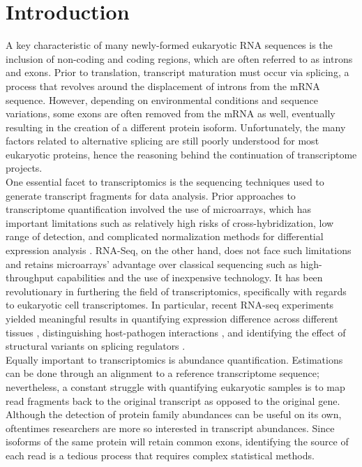 \section{Introduction}

A key characteristic of many newly-formed eukaryotic RNA sequences is the inclusion of non-coding and coding regions, 
which are often referred to as introns and exons. Prior to translation, transcript maturation must occur via splicing, 
a process that revolves around the displacement of introns from the mRNA sequence. However, depending on environmental 
conditions and sequence variations, some exons are often removed from the mRNA as well, eventually resulting in the creation of 
a different protein isoform. Unfortunately, the many factors related to alternative splicing are still poorly understood for most 
eukaryotic proteins, hence the reasoning behind the continuation of transcriptome projects.\\

One essential facet to transcriptomics is the sequencing techniques used to generate transcript fragments for data analysis. 
Prior approaches to transcriptome quantification involved the use of microarrays, which has important limitations such as relatively high 
risks of cross-hybridization, low range of detection, and complicated normalization methods for differential expression analysis 
\cite{Wang_Gerstein_Snyder_2009}. 
RNA-Seq, on the other hand, does not face such limitations and retains microarrays’ advantage over classical sequencing such as 
high-throughput capabilities and the use of inexpensive technology. It has been revolutionary in furthering the field of transcriptomics,
specifically with regards to eukaryotic cell transcriptomes. In particular, recent RNA-seq experiments yielded meaningful results in 
quantifying expression difference across different tissues \cite{Glinos_et_al._2022}, distinguishing host-pathogen interactions 
\cite{Pisu_Huang_Grenier_Russell_2020}, 
and identifying the effect of structural variants on splicing regulators \cite{Pascal_et_al._2023}. \\

Equally important to transcriptomics is abundance quantification. Estimations can be done through an alignment to a 
reference transcriptome sequence; nevertheless, a constant struggle with quantifying eukaryotic samples is to map read 
fragments back to the original transcript as opposed to the original gene. Although the detection of protein family abundances 
can be useful on its own, oftentimes researchers are more so interested in transcript abundances. Since isoforms of the same 
protein will retain common exons, identifying the source of each read is a tedious process that requires 
complex statistical methods.\\

